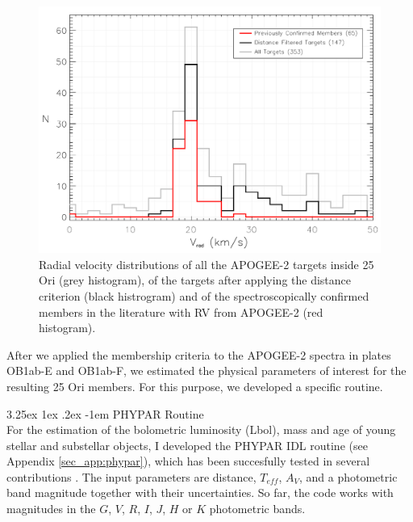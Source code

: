 \documentclass[12pt]{article}
\makeatletter
\newcounter{subsubsubsection}[subsubsection]
\renewcommand\paragraph{\@startsection{paragraph}{5}{\z@}%
  {3.25ex \@plus1ex \@minus.2ex}%
  {-1em}%
  {\normalfont\normalsize\bfseries}}
\makeatother
\begin{document}
\begin{figure}%
	\centering
	\includegraphics[width=1.\textwidth]{radial_velocity.pdf}
	\caption[Radial velocity distributions of the APOGEE-2 targets and members of 25 Ori.]{Radial velocity distributions of all the APOGEE-2 targets inside 25 Ori (grey histogram), of the targets after applying the distance criterion (black histrogram) and of the spectroscopically confirmed members in the literature with RV from APOGEE-2 (red histogram).}
	\label{fig_APOGEE-2:rv}
\end{figure}

\label{sec_APOGEE-2:physical_parameters}
After we applied the membership criteria to the APOGEE-2 spectra in plates OB1ab-E and OB1ab-F, we estimated the physical parameters of interest for the resulting 25 Ori members. For this purpose, we developed a specific routine.

\paragraph{PHYPAR Routine\\}
\label{sec_APOGEE-2:phypar}
For the estimation of the bolometric luminosity (\ac{Lbol}), mass and age of young stellar and substellar objects, I developed the PHYPAR IDL routine (see Appendix \ref{sec_app:phypar}), which has been succesfully tested in several contributions \citep{Suarez2017,Kounkel2018,Ramirez-Preciado2018}. The input parameters are distance, $T_{eff}$, $A_V$, and a photometric band magnitude together with their uncertainties. So far, the code works with magnitudes in the $G$, $V$, $R$, $I$, $J$, $H$ or $K$ photometric bands.
\end{document}
